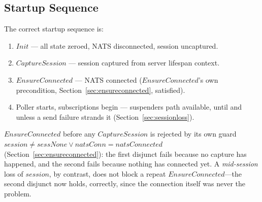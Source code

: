 \documentclass[a4paper,10pt,fleqn]{article}
\begin{document}
\subsection{Startup Sequence}

The correct startup sequence is:
\begin{enumerate}
  \item $Init$ --- all state zeroed, NATS disconnected, session uncaptured.
  \item $CaptureSession$ --- session captured from server lifespan context.
  \item $EnsureConnected$ --- NATS connected ($EnsureConnected$'s own
    precondition, Section~\ref{sec:ensureconnected}, satisfied).
  \item Poller starts, subscriptions begin --- suspenders path available,
    until and unless a send failure strands it
    (Section~\ref{sec:sessionloss}).
\end{enumerate}

$EnsureConnected$ before any $CaptureSession$ is rejected by its own
guard $session \neq sessNone \lor natsConn = natsConnected$
(Section~\ref{sec:ensureconnected}): the first disjunct fails because
no capture has happened, and the second fails because nothing has
connected yet.  A \emph{mid-session} loss of $session$, by contrast,
does not block a repeat $EnsureConnected$---the second disjunct now
holds, correctly, since the connection itself was never the problem.
\end{document}
